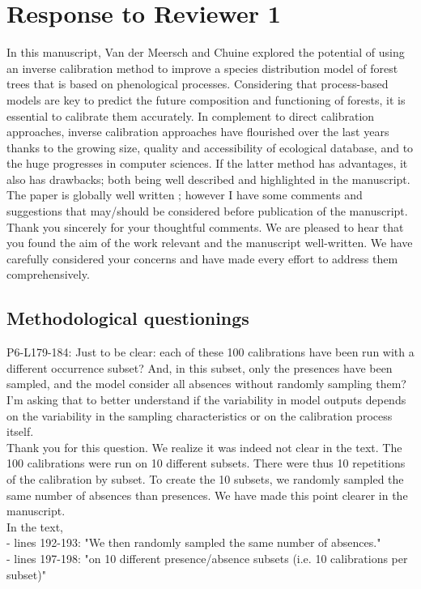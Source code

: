 \documentclass[a4paper, 11pt]{article}
\begin{document}
\section{Response to Reviewer 1}
In this manuscript, Van der Meersch and Chuine explored the potential of using an inverse calibration method to improve a species distribution model of forest trees that is based on phenological processes. Considering that process-based models are key to predict the future composition and functioning of forests, it is essential to calibrate them accurately. In complement to direct calibration approaches, inverse calibration approaches have flourished over the last years thanks to the growing size, quality and accessibility of ecological database, and to the huge progresses in computer sciences. If the latter method has advantages, it also has drawbacks; both being well described and highlighted in the manuscript. The paper is globally well written ; however I have some comments and suggestions that may/should be considered before publication of the manuscript.\\
\textcolor{customblue}{Thank you sincerely for your thoughtful comments. We are pleased to hear that you found the aim of the work relevant and the manuscript well-written. We have carefully considered your concerns and have made every effort to address them comprehensively.}\\

\subsection{Methodological questionings}

P6-L179-184: Just to be clear: each of these 100 calibrations have been run with a different occurrence subset? And, in this subset, only the presences have been sampled, and the model consider all absences without randomly sampling them? I'm asking that to better understand if the variability in model outputs depends on the variability in the sampling characteristics or on the calibration process itself. \\
\textcolor{customblue}{Thank you for this question. We realize it was indeed not clear in the text. The 100 calibrations were run on 10 different subsets. There were thus 10 repetitions of the calibration by subset. To create the 10 subsets, we randomly sampled the same number of absences than presences. We have made this point clearer in the manuscript.}\\
In the text,\\ 
- lines 192-193: \textcolor{customred}{"We then randomly sampled the same number of absences."}\\ 
- lines 197-198: \textcolor{customred}{"on 10 different presence/absence subsets (i.e. 10 calibrations per subset)"}\\
\end{document}
